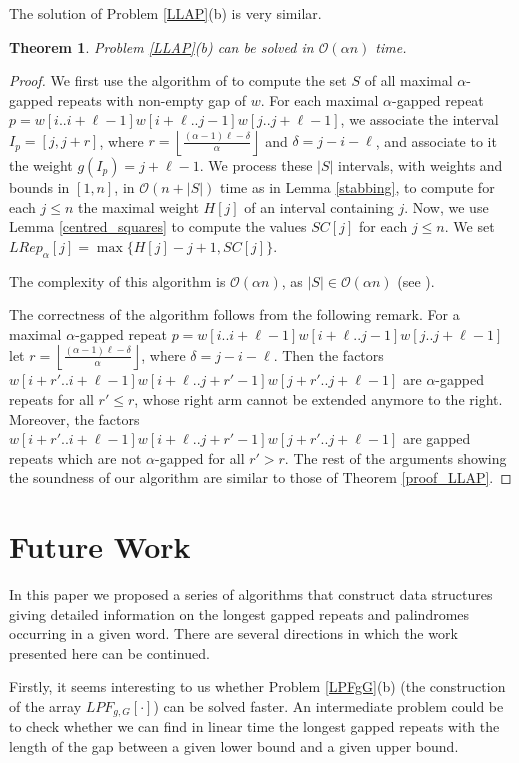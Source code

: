 \documentclass[final]{dmtcs-episciences}
\newcommand{\bigo}{{\mathcal O}}
\newcommand{\LPdF}{{\mathit{LPF}}}
\newcommand{\LR}{{\mathit{LRep}}_\alpha}
\newtheorem{theorem}{Theorem}
\begin{document}
The solution of Problem \ref{LLAP}(b) is very similar. 
\begin{theorem}\label{sol_LLAR}
Problem \ref{LLAP}(b) can be solved in $\bigo(\alpha n)$ time.
\end{theorem}
\begin{proof}
We first use the algorithm of \cite{STACS2016} to compute the set $S$ of all maximal $\alpha$-gapped repeats with non-empty gap of $w$. For each maximal $\alpha$-gapped repeat $p=w[i..i+\ell-1]w[i+\ell..j-1]w[j..j+\ell-1]$, we associate the interval $I_p=[j,j+r]$, where $r=\left \lfloor \frac{(\alpha-1)\ell-\delta}{\alpha}\right\rfloor$ and $\delta=j-i-\ell$, and associate to it the weight $g(I_p)=j+\ell-1$. We process these $|S|$ intervals, with weights and bounds in $[1,n]$, in $\bigo(n+|S|)$ time as in Lemma \ref{stabbing}, to compute for each $j\leq n$ the maximal weight $H[j]$ of an interval containing $j$. Now, we use Lemma \ref{centred_squares} to compute the values $SC[j]$ for each $j\leq n$. We set $\LR[j]=\max\{H[j]-j+1,SC[j]\}$.

The complexity of this algorithm is $\bigo(\alpha n)$, as $|S|\in \bigo(\alpha n)$ (see \cite{STACS2016}).

The correctness of the algorithm follows from the following remark. For a maximal $\alpha$-gapped repeat $p=w[i..i+\ell-1]w[i+\ell..j-1]w[j..j+\ell-1]$ let $r=\left \lfloor \frac{(\alpha-1)\ell-\delta}{\alpha}\right\rfloor$, where $\delta=j-i-\ell$. Then the factors $w[i+r'..i+\ell-1]w[i+\ell..j+r'-1]w[j+r'..j+\ell-1]$ are $\alpha$-gapped repeats for all $r'\leq r$, whose right arm cannot be extended anymore to the right. Moreover,  the factors $w[i+r'..i+\ell-1]w[i+\ell..j+r'-1]w[j+r'..j+\ell-1]$ are gapped repeats which are not $\alpha$-gapped for all $r'> r$. The rest of the arguments showing the soundness of our algorithm are similar to those of Theorem \ref{proof_LLAP}.
\end{proof}

\section{Future Work}

In this paper we proposed a series of algorithms that construct data structures giving detailed information on the longest gapped repeats  and palindromes occurring in a given word. There are several directions in which the work presented here can be continued.

Firstly, it seems interesting to us whether Problem \ref{LPFgG}(b) (the construction of the array $\LPdF_{g,G}[\cdot]$) can be solved faster. An intermediate problem could be to check whether we can find in linear time the longest gapped repeats with the length of the gap between a given lower bound and a given upper bound. 
\end{document}
